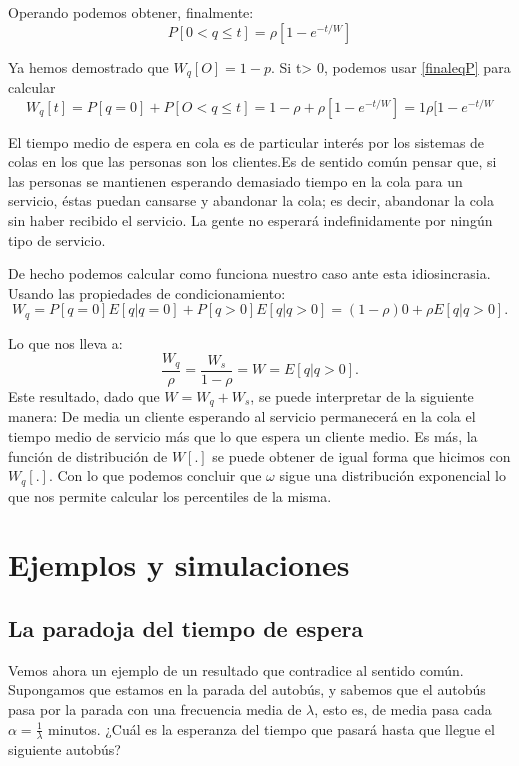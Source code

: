 \documentclass[a4paper,10pt]{scrartcl}
\theoremstyle{definition}
\theoremstyle{definition}
\numberwithin{equation}{section}
\begin{document}
	Operando podemos obtener, finalmente:
	\begin{equation*}
	P[0<q\leq t]=\rho[1-e^{-t/W}]
	\label{finaleqP}
	\end{equation*}
	
	
	Ya hemos demostrado que $W_q [O] = 1 - p$. Si t> 0, podemos usar \ref{finaleqP} para calcular 
	\[W_q [t]=P [q = 0] + P [O <q \leq t]= 1 - \rho + \rho [1 - e^{- t / W}]=1\rho[1-e^{-t/W}\]
	
	El tiempo medio de espera en cola es de particular interés por los sistemas de colas en los que las personas son los clientes.Es de sentido común pensar que, si las personas se mantienen esperando demasiado tiempo en la cola para un servicio, éstas puedan cansarse y abandonar la cola; es decir, abandonar la cola sin haber recibido el servicio. La gente no esperará indefinidamente por ningún tipo de servicio.
	
	De hecho podemos calcular como funciona nuestro caso ante esta idiosincrasia. Usando las propiedades de condicionamiento:
	\begin{equation*}
	W_q = P [q = 0] E [q|q = 0] + P [q> 0]E [q|q> 0] = (1 - \rho)  0 + \rho E [q|q> 0].
	\end{equation*}
	
	Lo que nos lleva a:
	\begin{equation*}
	\frac{W_q}{\rho}=\frac{W_s}{1-\rho}=W= E [q|q> 0].
	\end{equation*}
	Este resultado, dado que $W=W_q+W_s$, se puede interpretar de la siguiente manera: De media un cliente esperando al servicio permanecerá en la cola el tiempo medio de servicio más que lo que espera un cliente medio.
	Es más, la función de distribución de $W[.]$ se puede obtener de igual forma que hicimos con $W_q[.]$. Con lo que podemos concluir que $\omega$ sigue una distribución exponencial lo que nos permite calcular los percentiles de la misma.
	
	\section{Ejemplos y simulaciones}
	\subsection{La paradoja del tiempo de espera}
	Vemos ahora un ejemplo de un resultado que contradice al sentido común. Supongamos que estamos en la parada del autobús, y sabemos que el autobús pasa por la parada con una frecuencia media de $\lambda$, esto es, de media pasa cada $\alpha=\frac{1}{\lambda}$ minutos. ¿Cuál es la esperanza del tiempo que pasará hasta que llegue el siguiente autobús?
	
\end{document}
